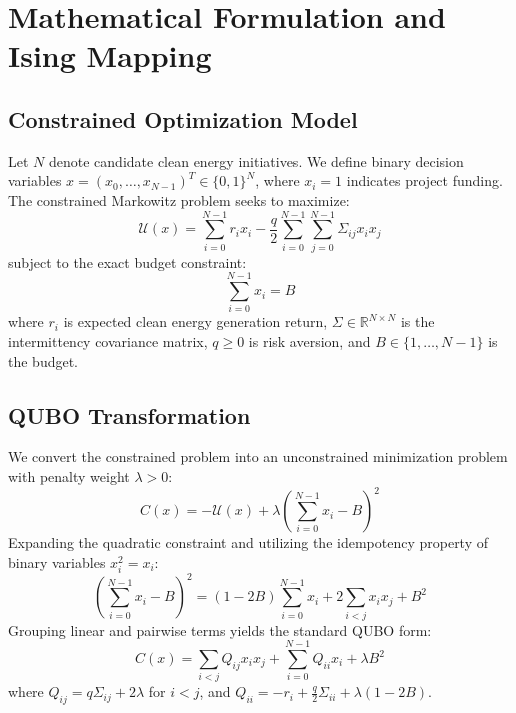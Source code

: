 \section{Mathematical Formulation and Ising Mapping}

\subsection{Constrained Optimization Model}
Let $N$ denote candidate clean energy initiatives. We define binary decision variables $x = (x_0, \dots, x_{N-1})^T \in \{0, 1\}^N$, where $x_i = 1$ indicates project funding.
The constrained Markowitz problem seeks to maximize:
\begin{equation}
\mathcal{U}(x) = \sum_{i=0}^{N-1} r_i x_i - \frac{q}{2} \sum_{i=0}^{N-1}\sum_{j=0}^{N-1} \Sigma_{ij} x_i x_j
\end{equation}
subject to the exact budget constraint:
\begin{equation}
\sum_{i=0}^{N-1} x_i = B
\end{equation}
where $r_i$ is expected clean energy generation return, $\Sigma \in \mathbb{R}^{N \times N}$ is the intermittency covariance matrix, $q \ge 0$ is risk aversion, and $B \in \{1, \dots, N-1\}$ is the budget.

\subsection{QUBO Transformation}
We convert the constrained problem into an unconstrained minimization problem with penalty weight $\lambda > 0$:
\begin{equation}
C(x) = -\mathcal{U}(x) + \lambda \left(\sum_{i=0}^{N-1} x_i - B\right)^2
\end{equation}
Expanding the quadratic constraint and utilizing the idempotency property of binary variables $x_i^2 = x_i$:
\begin{equation}
\left(\sum_{i=0}^{N-1} x_i - B\right)^2 = (1 - 2B)\sum_{i=0}^{N-1} x_i + 2 \sum_{i < j} x_i x_j + B^2
\end{equation}
Grouping linear and pairwise terms yields the standard QUBO form:
\begin{equation}
C(x) = \sum_{i < j} Q_{ij} x_i x_j + \sum_{i=0}^{N-1} Q_{ii} x_i + \lambda B^2
\end{equation}
where $Q_{ij} = q \Sigma_{ij} + 2\lambda$ for $i < j$, and $Q_{ii} = -r_i + \frac{q}{2}\Sigma_{ii} + \lambda(1 - 2B)$.

